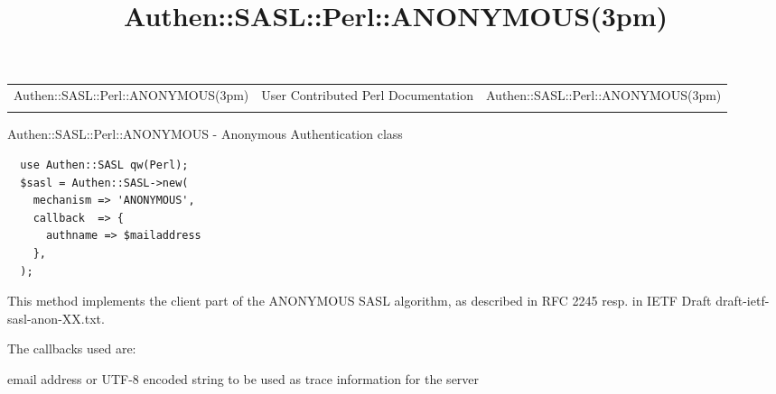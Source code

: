 \documentclass[]{article}
\title{Authen::SASL::Perl::ANONYMOUS(3pm)}
\author{}
\date{}
\begin{document}
\maketitle

\begin{longtable}[c]{@{}lll@{}}
\toprule\addlinespace
Authen::SASL::Perl::ANONYMOUS(3pm) & User Contributed Perl Documentation
& Authen::SASL::Perl::ANONYMOUS(3pm)
\\\addlinespace
\bottomrule
\end{longtable}


Authen::SASL::Perl::ANONYMOUS - Anonymous Authentication class


\begin{verbatim}
  use Authen::SASL qw(Perl);
  $sasl = Authen::SASL->new(
    mechanism => 'ANONYMOUS',
    callback  => {
      authname => $mailaddress
    },
  );
\end{verbatim}


This method implements the client part of the ANONYMOUS SASL algorithm,
as described in RFC 2245 resp. in IETF Draft
draft-ietf-sasl-anon-XX.txt.


The callbacks used are:

\begin{description}
\itemsep1pt\parskip0pt
\item[authname]
email address or UTF-8 encoded string to be used as trace information
for the server
\end{description}
\end{document}
